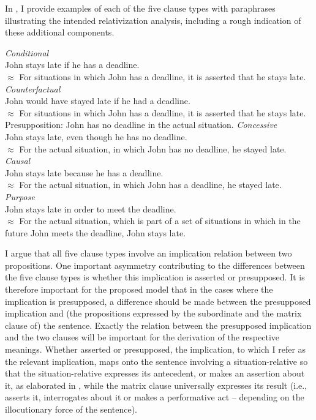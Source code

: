 \documentclass[output=paper,
colorlinks,
citecolor=brown,
newtxmath
]{langscibook}
\begin{document}
In , I provide examples of each of the five clause types with paraphrases illustrating the intended relativization analysis, including a rough indication of these additional components.

\largerpage[-2] %

\ea\label{ex:Sit-Rel-Cl}
\ea \textit{Conditional}\\John stays late if he has a deadline.\\
	$\approx$ For situations in which John has a deadline, it is asserted that he stays late.\label{ex:Sit-Rel-Cl-a}
\ex \textit{Counterfactual}\\John would have stayed late if he had a deadline.\\
    $\approx$ For situations in which John has a deadline, it is asserted that he stays late.\\
    Presupposition: John has no deadline in the actual situation.\label{ex:Sit-Rel-Cl-b}
\ex \textit{Concessive}\\John stays late, even though he has no deadline.\\
	$\approx$ For the actual situation, in which John has no deadline, he stayed late.\label{ex:Sit-Rel-Cl-c}
\ex \textit{Causal}\\John stays late because he has a deadline.\\
	$\approx$ For the actual situation, in which John has a deadline, he stayed late.\label{ex:Sit-Rel-Cl-d}
\ex \textit{Purpose}\\John stays late in order to meet the deadline.\\
	$\approx$ For the actual situation, which is part of a set of situations in which in the future John meets the deadline, John stays late.\label{ex:Sit-Rel-Cl-e}
\z\z

\noindent I argue that all five clause types involve an implication relation between two propositions. One important asymmetry contributing to the differences between the five clause types is whether this implication is asserted or presupposed. It is therefore important for the proposed model that in the cases where the implication is presupposed, a difference should be made between the presupposed implication and (the propositions expressed by the subordinate and the matrix clause of) the sentence. Exactly the relation between the presupposed implication and the two clauses will be important for the derivation of the respective meanings. Whether asserted or presupposed, the implication, to which I refer as the relevant implication, maps onto the sentence involving a situation-relative so that the situation-relative expresses its antecedent, or makes an assertion about it, as elaborated in , while the matrix clause universally expresses its result (i.e., asserts it, interrogates about it or makes a performative act -- depending on the illocutionary force of the sentence).
\end{document}
